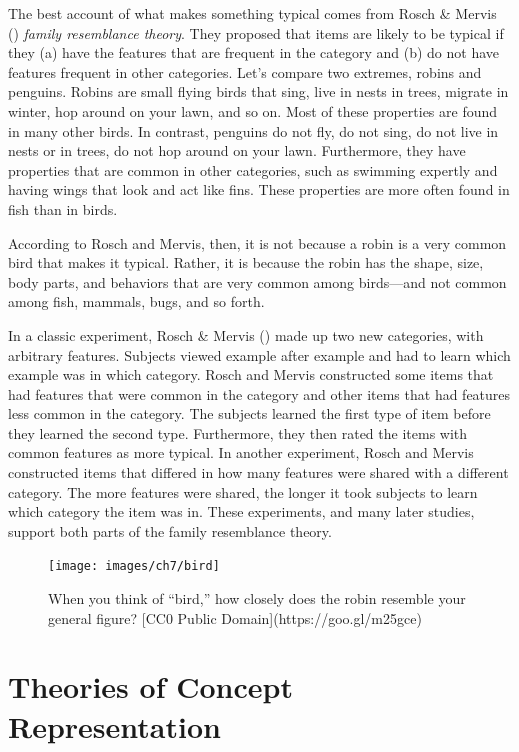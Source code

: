 \documentclass[
]{krantz}
\begin{document}
The best account of what makes something typical comes from Rosch \& Mervis () \emph{family resemblance theory}. They proposed that items are likely to be typical if they (a) have the features that are frequent in the category and (b) do not have features frequent in other categories. Let's compare two extremes, robins and penguins. Robins are small flying birds that sing, live in nests in trees, migrate in winter, hop around on your lawn, and so on. Most of these properties are found in many other birds. In contrast, penguins do not fly, do not sing, do not live in nests or in trees, do not hop around on your lawn. Furthermore, they have properties that are common in other categories, such as swimming expertly and having wings that look and act like fins. These properties are more often found in fish than in birds.

According to Rosch and Mervis, then, it is not because a robin is a very common bird that makes it typical. Rather, it is because the robin has the shape, size, body parts, and behaviors that are very common among birds---and not common among fish, mammals, bugs, and so forth.

In a classic experiment, Rosch \& Mervis () made up two new categories, with arbitrary features. Subjects viewed example after example and had to learn which example was in which category. Rosch and Mervis constructed some items that had features that were common in the category and other items that had features less common in the category. The subjects learned the first type of item before they learned the second type. Furthermore, they then rated the items with common features as more typical. In another experiment, Rosch and Mervis constructed items that differed in how many features were shared with a different category. The more features were shared, the longer it took subjects to learn which category the item was in. These experiments, and many later studies, support both parts of the family resemblance theory.

\begin{figure}

{\centering \texttt{[image: images/ch7/bird]} 

}

\caption{When you think of “bird,” how closely does the robin resemble your general figure? [CC0 Public Domain](https://goo.gl/m25gce)}\label{fig:bird}
\end{figure}

\section{Theories of Concept Representation}\label{theories-of-concept-representation}
\end{document}
